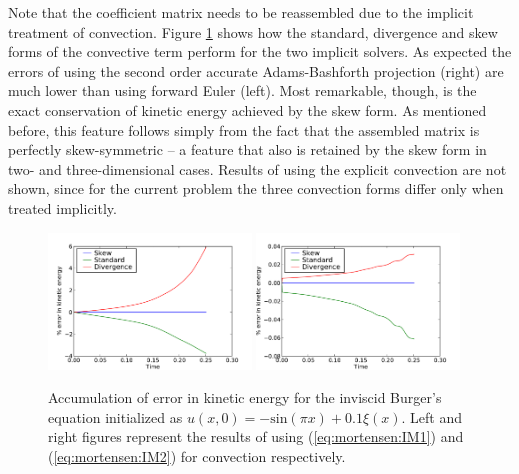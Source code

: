 Note that the coefficient matrix  needs to be reassembled due to the
implicit treatment of convection. Figure \ref{fig:mortensen:burgers_KE} shows
how the standard, divergence and skew forms of the convective term
perform for the two implicit solvers. As expected the errors of using
the second order accurate Adams-Bashforth projection (right) are much
lower than using forward Euler (left). Most remarkable, though, is the
exact conservation of kinetic energy achieved by the skew form. As
mentioned before, this feature follows simply from the fact that
the assembled matrix  is perfectly skew-symmetric -- a feature
that also is retained by the skew form in two- and three-dimensional
cases. Results of using the explicit convection are not shown, since
for the current problem the three convection forms differ only when
treated implicitly.

\begin{figure}
 \includegraphics[width=0.48\textwidth]{chapters/mortensen/pdf/Burgers_KE_IM1.pdf}
 \includegraphics[width=0.48\textwidth]{chapters/mortensen/pdf/Burgers_KE_IM2.pdf}
 \caption{
Accumulation of error in kinetic energy for the inviscid Burger's equation initialized as $u(x,0)=-\text{sin}(\pi x)+0.1 \xi(x)$. Left and right figures represent the results of using (\eqref{eq:mortensen:IM1}) and (\eqref{eq:mortensen:IM2}) for convection respectively.
}
\label{fig:mortensen:burgers_KE}
\end{figure}

